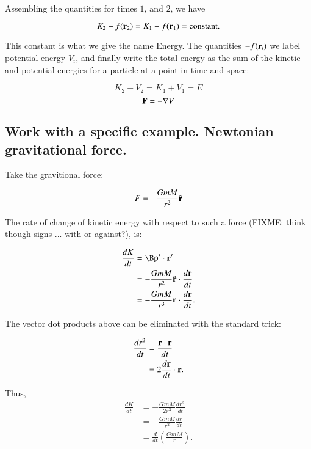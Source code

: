 \documentclass{article}      %
\newcommand{\grad}[0]{\nabla}
\begin{document}
Assembling the quantities for times $1$, and $2$, we have

\begin{equation}
K_2 -f(\mathbf{r}_2) = K_1 - f(\mathbf{r}_1) = \text{constant}.
\end{equation}

This constant is what we give the name Energy.  The quantities $-f(\mathbf{r}_i)$ we label potential energy $V_i$, and finally write the total energy as the sum of the kinetic and potential energies for a particle at a point in time and space:

\begin{equation}
K_2 + V_2 = K_1 + V_1 = E
\end{equation}
\begin{equation}
\BF = -\grad V
\end{equation}

\subsection{ Work with a specific example.  Newtonian gravitational force.}

Take the gravitional force:

\begin{equation}
F = -\frac{GmM}{r^2} \hat{\mathbf{r}}
\end{equation}

The rate of change of kinetic energy with respect to such a force (FIXME: think though signs ... with or against?), is:

\begin{align*}
\frac{dK}{dt} 
&= \Bp' \cdot \Br' \\
&= -\frac{GmM}{r^2} \rcap \cdot \frac{d\Br}{dt} \\
&= -\frac{GmM}{r^3} \Br \cdot \frac{d\Br}{dt}.
\end{align*}

The vector dot products above can be eliminated with the standard trick:

\begin{align*}
\frac{dr^2}{dt} 
&= \frac{\mathbf{r} \cdot \mathbf{r}}{dt} \\
&= 2 \frac{d\mathbf{r}}{dt} \cdot \mathbf{r}.
\end{align*}

Thus,
\begin{align*}
\frac{dK}{dt} 
&= -\frac{GmM }{2r^3} \frac{dr^2}{dt} \\
&= -\frac{GmM }{r^2} \frac{dr}{dt} \\
&= \frac{d}{dt} \left( \frac{GmM }{r} \right).
\end{align*}
\end{document}
